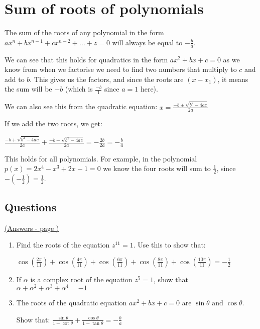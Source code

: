 \documentclass[../main.tex]{subfiles}
\begin{document}
\section{Sum of roots of polynomials}
The sum of the roots of any polynomial in the form \(ax^n+bx^{n-1}+cx^{n-2}+...+z=0\) will always be equal to \(-\frac{b}{a}\).

We can see that this holds for quadratics in the form \(ax^2+bx+c=0\) as we know from when we factorise we need to find two numbers that multiply to \(c\) and add to \(b\). This gives us the factors, and since the roots are \((x-x_1)\), it means the sum will be \(-b\) (which is \(\frac{-b}{1}\) since \(a=1\) here).

We can also see this from the quadratic equation:
\(x=\frac{-b\pm\sqrt{b^2-4ac}}{2a}\)

If we add the two roots, we get:

\(\frac{-b+\sqrt{b^2-4ac}}{2a}+\frac{-b-\sqrt{b^2-4ac}}{2a}=-\frac{2b}{2a}=-\frac{b}{a}\)

This holds for all polynomials. For example, in the polynomial \(p(x)=2x^4-x^3+2x-1=0\) we know the four roots will sum to \(\frac{1}{2}\), since \(-(-\frac{1}{2})=\frac{1}{2}\).

\pagebreak
\hypertarget{sumofrootslink}{\subsection*{Questions}}
\hyperlink{sumofrootsanswers}{(Answers - page {\pageref*{Sum of roots answers}})}

\label{Sum of roots}
\begin{enumerate}
    \item Find the roots of the equation \(z^{11}=1\). Use this to show that:
    
    \(\cos{(\frac{2\pi}{11})}+\cos{(\frac{4\pi}{11})+\cos{(\frac{6\pi}{11})+\cos{(\frac{8\pi}{11})+\cos{(\frac{10\pi}{11})=-\frac{1}{2}}}}}\)

    \item If \(\alpha\) is a complex root of the equation \(z^5=1 \), show that \(\alpha+\alpha^2+\alpha^3+\alpha^4=-1\)
    
    \item The roots of the quadratic equation \(ax^2+bx+c=0\) are \(\sin{\theta}\text{ and } \cos{\theta}\).
    
    Show that: \(\frac{\sin{\theta}}{1-\cot{\theta}}+\frac{\cos{\theta}}{1-\tan{\theta}}=-\frac{b}{a}\)
\end{enumerate}
\end{document}
